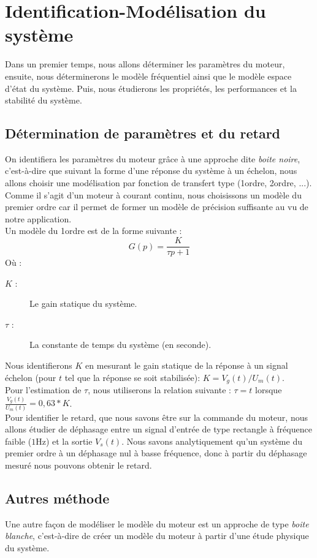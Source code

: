 \chapter{Identification-Modélisation du système}
Dans un premier temps, nous allons déterminer les paramètres du moteur, ensuite, nous déterminerons le modèle fréquentiel ainsi que le modèle espace d'état du système. Puis, nous étudierons les propriétés, les performances et la stabilité du système. 
	\section{Détermination de paramètres et du retard}
	On identifiera les paramètres du moteur grâce à une approche dite \emph{boite noire}, c'est-à-dire que suivant la forme d'une réponse du système à un échelon, nous allons choisir une modélisation par fonction de transfert type (1\ier ordre, 2\ieme ordre, ...). Comme il s'agit d'un moteur à courant continu, nous choisissons un modèle du premier ordre car il permet de former un modèle de précision suffisante au vu de notre application.\\
Un modèle du 1\ier ordre est de la forme suivante :
\begin{equation}
G(p) = \frac{K}{\tau p+1}
\end{equation}
Où : 
\begin{description}
\item[$K$ :] Le gain statique du système.
\item[$\tau$ :] La constante de temps du système (en seconde).
\end{description}

\noindent Nous identifierons $K$ en mesurant le gain statique  de la réponse à un signal échelon (pour $t$ tel que la réponse se soit stabilisée): $ K = V_g(t)/U_m(t)$.\\
\noindent Pour l'estimation de $\tau$, nous utiliserons la relation suivante : $ \tau = t$ lorsque $\frac{V_g(t)}{U_m(t)} = 0,63*K $.\\

Pour identifier le retard, que nous savons être sur la commande du moteur, nous allons étudier de déphasage entre un signal d'entrée de type rectangle à fréquence faible ($1$Hz) et la sortie $V_s(t)$. Nous savons analytiquement qu'un système du premier ordre à un déphasage nul à basse fréquence, donc à partir du déphasage mesuré nous pouvons obtenir le retard.

	\section{Autres méthode}
Une autre façon de modéliser le modèle du moteur est un approche de type \emph{boite blanche}, c'est-à-dire de créer un modèle du moteur à partir d'une étude physique du système. 
